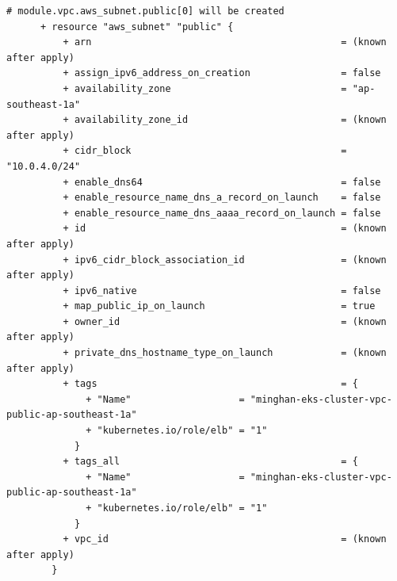 \begin{lstlisting}[caption={terraform plan output for \texttt{cloudkube} provisioning}, breaklines=true, breakatwhitespace=false]
      # module.vpc.aws_subnet.public[0] will be created
      + resource "aws_subnet" "public" {
          + arn                                            = (known after apply)
          + assign_ipv6_address_on_creation                = false
          + availability_zone                              = "ap-southeast-1a"
          + availability_zone_id                           = (known after apply)
          + cidr_block                                     = "10.0.4.0/24"
          + enable_dns64                                   = false
          + enable_resource_name_dns_a_record_on_launch    = false
          + enable_resource_name_dns_aaaa_record_on_launch = false
          + id                                             = (known after apply)
          + ipv6_cidr_block_association_id                 = (known after apply)
          + ipv6_native                                    = false
          + map_public_ip_on_launch                        = true
          + owner_id                                       = (known after apply)
          + private_dns_hostname_type_on_launch            = (known after apply)
          + tags                                           = {
              + "Name"                   = "minghan-eks-cluster-vpc-public-ap-southeast-1a"
              + "kubernetes.io/role/elb" = "1"
            }
          + tags_all                                       = {
              + "Name"                   = "minghan-eks-cluster-vpc-public-ap-southeast-1a"
              + "kubernetes.io/role/elb" = "1"
            }
          + vpc_id                                         = (known after apply)
        }
    

\end{lstlisting}
